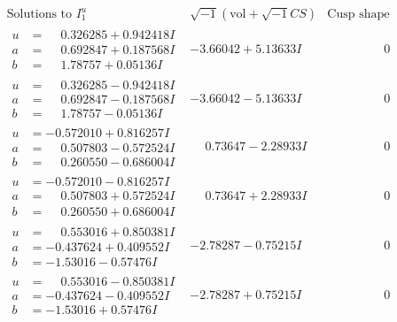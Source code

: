 \documentclass[1p]{elsarticle_modified}
\theoremstyle{definition}
\newcommand{\I}{\sqrt{-1}}
\begin{document}
$$\begin{array}{c|c|c}  
\text{Solutions to }I^u_{1}& \I (\text{vol} + \sqrt{-1}CS) & \text{Cusp shape}\\
 \hline 
\begin{aligned}
u &= \phantom{-}0.326285 + 0.942418 I \\
a &= \phantom{-}0.692847 + 0.187568 I \\
b &= \phantom{-}1.78757 + 0.05136 I\end{aligned}
 & -3.66042 + 5.13633 I & \phantom{-0.000000 } 0 \\ \hline\begin{aligned}
u &= \phantom{-}0.326285 - 0.942418 I \\
a &= \phantom{-}0.692847 - 0.187568 I \\
b &= \phantom{-}1.78757 - 0.05136 I\end{aligned}
 & -3.66042 - 5.13633 I & \phantom{-0.000000 } 0 \\ \hline\begin{aligned}
u &= -0.572010 + 0.816257 I \\
a &= \phantom{-}0.507803 - 0.572524 I \\
b &= \phantom{-}0.260550 - 0.686004 I\end{aligned}
 & \phantom{-}0.73647 - 2.28933 I & \phantom{-0.000000 } 0 \\ \hline\begin{aligned}
u &= -0.572010 - 0.816257 I \\
a &= \phantom{-}0.507803 + 0.572524 I \\
b &= \phantom{-}0.260550 + 0.686004 I\end{aligned}
 & \phantom{-}0.73647 + 2.28933 I & \phantom{-0.000000 } 0 \\ \hline\begin{aligned}
u &= \phantom{-}0.553016 + 0.850381 I \\
a &= -0.437624 + 0.409552 I \\
b &= -1.53016 - 0.57476 I\end{aligned}
 & -2.78287 - 0.75215 I & \phantom{-0.000000 } 0 \\ \hline\begin{aligned}
u &= \phantom{-}0.553016 - 0.850381 I \\
a &= -0.437624 - 0.409552 I \\
b &= -1.53016 + 0.57476 I\end{aligned}
 & -2.78287 + 0.75215 I & \phantom{-0.000000 } 0 \\ \hline\begin{aligned}

\end{aligned}
\end{array}$$
\end{document}
